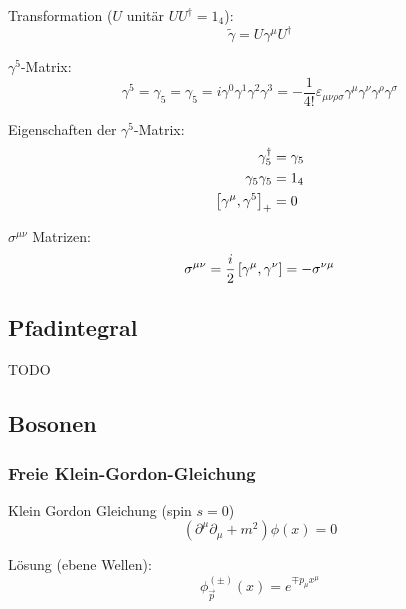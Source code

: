 \documentclass[11pt]{article}
\numberwithin{equation}{section}
\begin{document}
				\noindent
				Transformation ($U$ unitär $U U^\dagger=1_4$):
				\begin{equation}
					\tilde{\gamma} = U \gamma^\mu U^\dagger
				\end{equation}

				\noindent
				$\gamma^5$-Matrix:
				\begin{equation}
					\gamma^5 = \gamma_5 = \gamma_5 = i\gamma^0 \gamma^1 \gamma^2 \gamma^3 = -\frac{1}{4!}\varepsilon_{\mu\nu\rho\sigma} \gamma^\mu \gamma^\nu \gamma^\rho \gamma^\sigma
				\end{equation}

				\noindent
				Eigenschaften der $\gamma^5$-Matrix:
				\begin{equation}
					\begin{aligned}
						\gamma_5^\dagger &= \gamma_5 \\
						\gamma_5 \gamma_5 &= 1_4 \\
						\left[\gamma^\mu,\gamma^5\right]_{+} &= 0 \\
					\end{aligned}
				\end{equation}

				\noindent
				$\sigma^{\mu\nu}$ Matrizen:
				\begin{equation}
					\sigma^{\mu\nu} = \frac{i}{2}\left[\gamma^\mu,\gamma^\nu\right] = -\sigma^{\nu\mu}
				\end{equation}


		\subsection{Pfadintegral}
			TODO

		\subsection{Bosonen}
			\subsubsection{Freie Klein-Gordon-Gleichung}
				\noindent
				Klein Gordon Gleichung (spin $s=0$)
				\begin{equation}
					\left(\partial^\mu\partial_\mu+m^2\right) \phi(x) = 0
				\end{equation}

				\noindent
				Lösung (ebene Wellen):
				\begin{equation}
					{\phi}^{ ( \pm ) }_{\vec{p}} (x) = e^{\mp p_\mu x^\mu}
				\end{equation}
\end{document}
